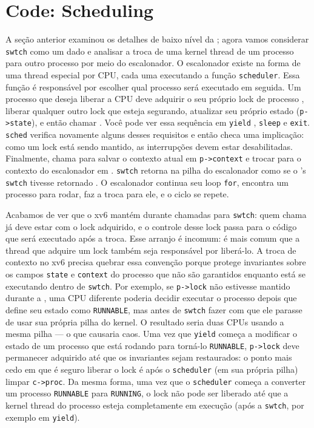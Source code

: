 \section{Code: Scheduling}

A seção anterior examinou os detalhes de baixo nível da
;
agora vamos considerar
\lstinline{swtch}
como um dado e analisar
a troca de uma kernel thread de um processo
para outro processo por meio do escalonador.
O escalonador existe na forma de uma thread especial por CPU, cada uma executando a função
\lstinline{scheduler}.
Essa função é responsável por escolher qual processo será executado em seguida.
Um processo que deseja liberar a CPU deve
adquirir o seu próprio lock de processo
,
liberar qualquer outro lock que esteja segurando,
atualizar seu próprio estado
(\lstinline{p->state}),
e então chamar
.
Você pode ver essa sequência em
\lstinline{yield}
,
\texttt{sleep}
e
\texttt{exit}.
\lstinline{sched}
verifica novamente alguns desses requisitos
e então checa uma implicação:
como um lock está sendo mantido, as interrupções devem estar desabilitadas.
Finalmente,
chama
para salvar o contexto atual em
\lstinline{p->context}
e trocar para o contexto do escalonador em
.
\lstinline{swtch}
retorna na pilha do escalonador
como se o
's
\lstinline{swtch}
tivesse retornado
.
O escalonador continua seu loop
\lstinline{for}, encontra um processo para rodar,
faz a troca para ele, e o ciclo se repete.

Acabamos de ver que o xv6 mantém
durante chamadas para
\lstinline{swtch}:
quem chama
já deve estar com o lock adquirido, e o controle desse lock passa para o código que será executado após a troca.
Esse arranjo é incomum: é mais comum que a thread que adquire um lock também seja responsável por liberá-lo.
A troca de contexto no xv6 precisa quebrar essa convenção porque
protege invariantes sobre os campos
\lstinline{state}
e
\lstinline{context}
do processo que não são garantidos enquanto está se executando dentro de
\lstinline{swtch}.
Por exemplo, se
\lstinline{p->lock}
não estivesse mantido durante a
,
uma CPU diferente poderia decidir executar o processo depois que
define seu estado como
\lstinline{RUNNABLE},
mas antes de
\lstinline{swtch}
fazer com que ele parasse de usar sua própria pilha do kernel.
O resultado seria duas CPUs usando a mesma pilha — o que causaria caos.
Uma vez que
\lstinline{yield}
começa a modificar o estado de um processo que está rodando para torná-lo
\lstinline{RUNNABLE},
\lstinline{p->lock}
deve permanecer adquirido até que os invariantes sejam restaurados:
o ponto mais cedo em que é seguro liberar o lock é após o
\lstinline{scheduler}
(em sua própria pilha) limpar
\lstinline{c->proc}.
Da mesma forma, uma vez que o
\lstinline{scheduler}
começa a converter um processo
\lstinline{RUNNABLE}
para
\lstinline{RUNNING},
o lock não pode ser liberado até que a kernel thread do processo esteja completamente em execução (após a
\lstinline{swtch},
por exemplo em
\lstinline{yield}).

